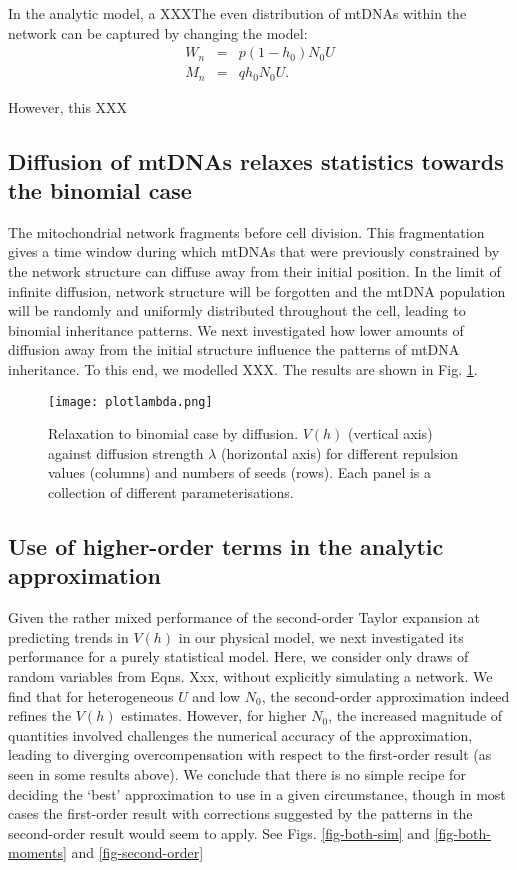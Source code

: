 \documentclass{article}
\begin{document}
In the analytic model, a XXXThe even distribution of mtDNAs within the network can be captured by changing the model:
\begin{eqnarray*}
  W_n & = & p(1-h_0)N_0 U \\
  M_n & = & qh_0 N_0 U.
\end{eqnarray*}

However, this XXX

\subsection*{Diffusion of mtDNAs relaxes statistics towards the binomial case}
The mitochondrial network fragments before cell division. This fragmentation gives a time window during which mtDNAs that were previously constrained by the network structure can diffuse away from their initial position. In the limit of infinite diffusion, network structure will be forgotten and the mtDNA population will be randomly and uniformly distributed throughout the cell, leading to binomial inheritance patterns. We next investigated how lower amounts of diffusion away from the initial structure influence the patterns of mtDNA inheritance. To this end, we modelled XXX. The results are shown in Fig. \ref{fig-lambda}.

\begin{figure}
  \texttt{[image: plotlambda.png]}
  \caption{Relaxation to binomial case by diffusion. $V(h)$ (vertical axis) against diffusion strength $\lambda$ (horizontal axis) for different repulsion values (columns) and numbers of seeds (rows). Each panel is a collection of different parameterisations.}
  \label{fig-lambda}
\end{figure}



\subsection*{Use of higher-order terms in the analytic approximation} 
Given the rather mixed performance of the second-order Taylor expansion at predicting trends in $V(h) $ in our physical model, we next investigated its performance for a purely statistical model. Here, we consider only draws of random variables from Eqns. Xxx, without explicitly simulating a network. We find that for heterogeneous $U$ and low $N_0$, the second-order approximation indeed refines the $V(h) $ estimates. However, for higher $N_0$, the increased magnitude of quantities involved challenges the numerical accuracy of the approximation, leading to diverging overcompensation with respect to the first-order result (as seen in some results above). We conclude that there is no simple recipe for deciding the `best' approximation to use in a given circumstance, though in most cases the first-order result with corrections suggested by the patterns in the second-order result would seem to apply. See Figs. \ref{fig-both-sim} and \ref{fig-both-moments} and \ref{fig-second-order}
\end{document}
